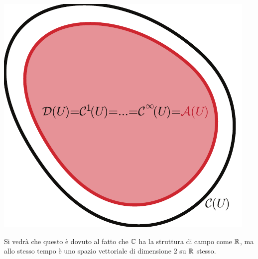 \begin{digressionwt}
\begin{center}
	\includegraphics[trim=0cm 0cm 0cm 0cm, clip, scale=0.45]{images/eulerovenn2.pdf}
\end{center}
	Si vedrà che questo è dovuto al fatto che $\mathbb{C}$ ha la struttura di campo come $\mathbb{R}$, ma allo stesso tempo è uno spazio vettoriale di dimensione $2$ su $\mathbb{R}$ stesso.
\end{digressionwt}

